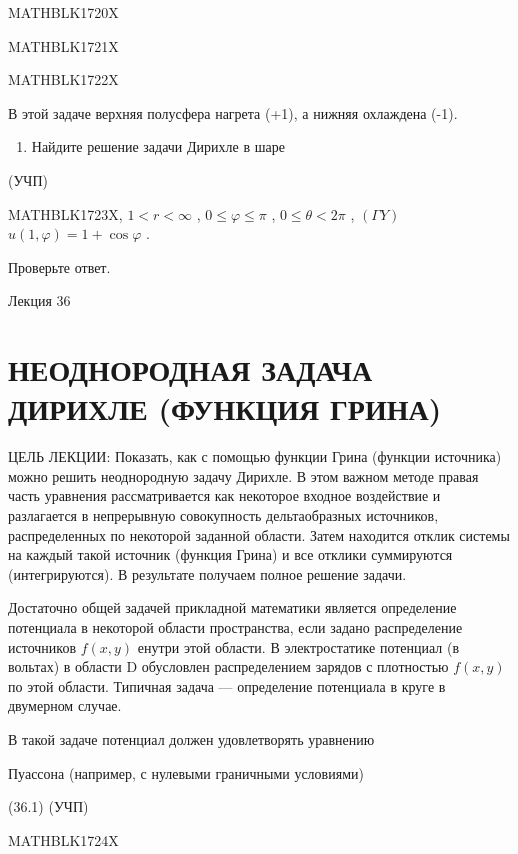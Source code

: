 \documentclass[
]{article}
\providecommand{\tightlist}{%
  \setlength{\itemsep}{0pt}\setlength{\parskip}{0pt}}
\begin{document}
{{{MATHBLK1720X

MATHBLK1721X

MATHBLK1722X

В этой задаче верхняя полусфера нагрета (+1), а нижняя охлаждена (-1).

\begin{enumerate}
\def\labelenumi{\arabic{enumi}.}
\setcounter{enumi}{5}
\tightlist
\item
  Найдите решение задачи Дирихле в шаре
\end{enumerate}

(УЧП)

MATHBLK1723X, \(1 < r < \infty\) , \(0 \le \varphi \le \pi\) ,
\(0 \le \theta < 2\pi\) , \((\Gamma Y)\)
\(u(1, \varphi) = 1 + \cos \varphi\) .

Проверьте ответ.

Лекция 36

\section{НЕОДНОРОДНАЯ ЗАДАЧА ДИРИХЛЕ (ФУНКЦИЯ
ГРИНА)}\label{ux43dux435ux43eux434ux43dux43eux440ux43eux434ux43dux430ux44f-ux437ux430ux434ux430ux447ux430-ux434ux438ux440ux438ux445ux43bux435-ux444ux443ux43dux43aux446ux438ux44f-ux433ux440ux438ux43dux430}

ЦЕЛЬ ЛЕКЦИИ: Показать, как с помощью функции Грина (функции источника)
можно решить неоднородную задачу Дирихле. В этом важном методе правая
часть уравнения рассматривается как некоторое входное воздействие и
разлагается в непрерывную совокупность дельтаобразных источников,
распределенных по некоторой заданной области. Затем находится отклик
системы на каждый такой источник (функция Грина) и все отклики
суммируются (интегрируются). В результате получаем полное решение
задачи.

Достаточно общей задачей прикладной математики является определение
потенциала в некоторой области пространства, если задано распределение
источников \(f(x, y)\) енутри этой области. В электростатике потенциал
(в вольтах) в области D обусловлен распределением зарядов с плотностью
\(f(x, y)\) по этой области. Типичная задача --- определение потенциала
в круге в двумерном случае.

В такой задаче потенциал должен удовлетворять уравнению

Пуассона (например, с нулевыми граничными условиями)

(36.1) (УЧП)

MATHBLK1724X

}}}
\end{document}
